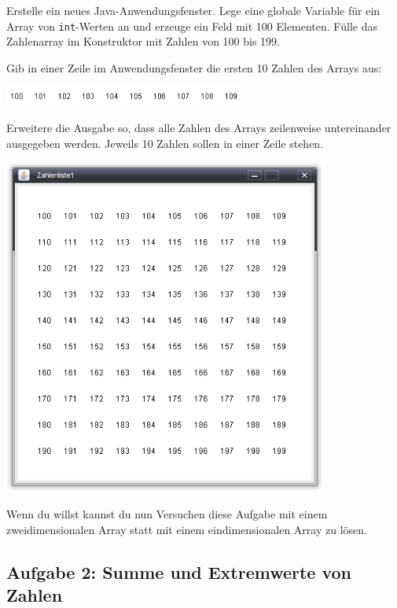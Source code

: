 \begin{compactenum}[a)]
\item Erstelle ein neues Java-Anwendungsfenster. Lege eine globale Variable
für ein Array von \lstinline|int|-Werten an und erzeuge ein Feld mit 100
Elementen. Fülle das Zahlenarray im Konstruktor mit Zahlen von 100 bis 199.

\item  Gib in einer Zeile im Anwendungsfenster die ersten 10 Zahlen des
Arrays aus:

\includegraphics[width=0.6\textwidth]{./inf/SEKII/18_Java_Arrays/Aufgabe1a.png}

\item Erweitere die Ausgabe so, dass alle Zahlen des Arrays zeilenweise
untereinander ausgegeben werden. Jeweils 10 Zahlen sollen in einer Zeile stehen.

\includegraphics[width=0.8\textwidth]{./inf/SEKII/18_Java_Arrays/Aufgabe1b.png}

\item Wenn du willst kannst du nun Versuchen diese Aufgabe mit einem
zweidimensionalen Array statt mit einem eindimensionalen Array zu lösen.
\end{compactenum}

\subsection{Aufgabe 2: Summe und Extremwerte von Zahlen}

